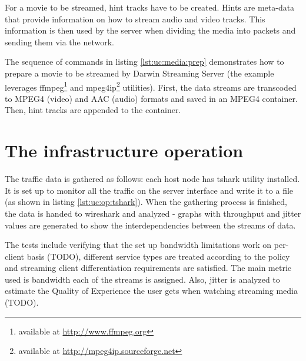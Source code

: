 \documentclass[11pt]{book}
\begin{document}
        For a movie to be streamed, hint tracks have to be created. Hints are meta-data that provide information on how
        to stream audio and video tracks. This information is then used by the server when dividing the media into
        packets and sending them via the network.

        The sequence of commands in listing \ref{lst:uc:media:prep} demonstrates how to prepare a movie to be streamed
        by Darwin Streaming Server (the example leverages ffmpeg\footnote{available at \url{http://www.ffmpeg.org}} and
        mpeg4ip\footnote{available at \url{http://mpeg4ip.sourceforge.net}} utilities). First, the data streams are
        transcoded to MPEG4 (video) and AAC (audio) formats and saved in an MPEG4 container. Then, hint tracks are
        appended to the container. \\

        \noindent
        \begin{minipage}{\textwidth}
          
        \end{minipage}


    \section{The infrastructure operation}
    \label{sec:uc:operation}

      The traffic data is gathered as follows: each host node has tshark utility installed. It is set up to monitor all
      the traffic on the server interface and write it to a file (as shown in listing \ref{lst:uc:op:tshark}). When the
      gathering process is finished, the data is handed to wireshark and analyzed - graphs with throughput and jitter
      values are generated to show the interdependencies between the streams of data. \\

      \noindent
      \begin{minipage}{\textwidth}
        
      \end{minipage}

      The tests include verifying that the set up bandwidth limitations work on per-client basis (TODO), different
      service types are treated according to the policy and streaming client differentiation requirements are satisfied.
      The main metric used is bandwidth each of the streams is assigned. Also, jitter is analyzed to estimate the
      Quality of Experience the user gets when watching streaming media (TODO).
\end{document}
